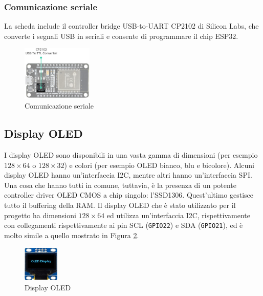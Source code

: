 \documentclass[a4paper,12pt]{report}  %
\newcommand{\lstinlinebg}[1]{\colorbox{backcolour}{\lstinline|#1|}}
\begin{document}
\subsubsection{Comunicazione seriale}
La scheda include il controller bridge USB-to-UART CP2102 di Silicon Labs, che converte i segnali USB in seriali e consente di programmare il chip ESP32.

\begin{figure}[h]
    \centering
    \includegraphics[width=0.3\textwidth]{imgs/ESP32-Hardware-Specifications-USB-to-TTL-Converter.jpg}
    \caption{Comunicazione seriale}
    \label{fig:ESP32-serial}
\end{figure}

\subsection{Display OLED}
I display OLED sono disponibili in una vasta gamma di dimensioni (per esempio $128 \times 64$ o $128 \times 32$) e colori (per esempio OLED bianco, blu e bicolore).
Alcuni display OLED hanno un'interfaccia I2C, mentre altri hanno un'interfaccia SPI.
Una cosa che hanno tutti in comune, tuttavia, è la presenza di un potente controller driver OLED CMOS a chip singolo: l'SSD1306.
Quest'ultimo gestisce tutto il buffering della RAM.
Il display OLED che è stato utilizzato per il progetto ha dimensioni $128 \times 64$ ed utilizza un'interfaccia I2C, rispettivamente con collegamenti rispettivamente ai pin SCL (\lstinlinebg{GPIO22}) e SDA (\lstinlinebg{GPIO21}), ed è molto simile a quello mostrato in Figura \ref{fig:OLED}.

\begin{figure}[h]
    \centering
    \includegraphics[width=0.15\textwidth]{imgs/128x64-Blue-I2C-OLED-Display.jpg}
    \caption{Display OLED}
    \label{fig:OLED}
\end{figure}
\end{document}
